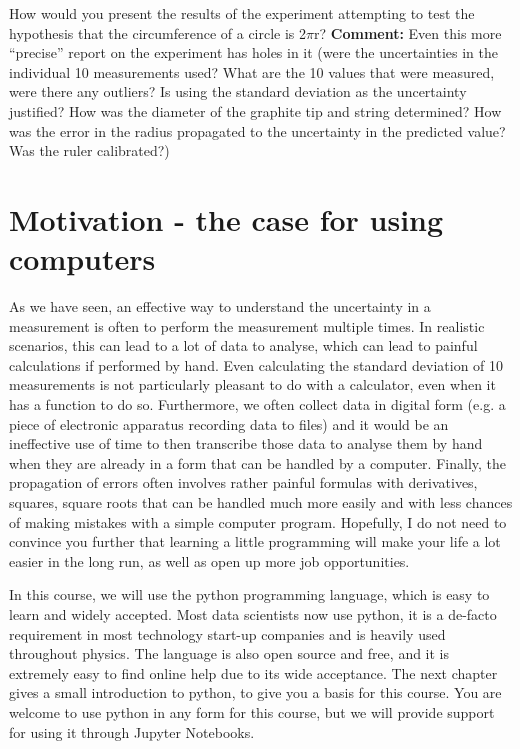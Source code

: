 \begin{example}{0pt}{How would you present the results of the experiment attempting to test the hypothesis that the circumference of a circle is 2$\pi$r?}{}
\textbf{Comment:} Even this more ``precise'' report on the experiment has holes in it (were the uncertainties in the individual 10 measurements used? What are the 10 values that were measured, were there any outliers? Is using the standard deviation as the uncertainty justified? How was the diameter of the graphite tip and string determined? How was the error in the radius propagated to the uncertainty in the predicted value? Was the ruler calibrated?)
\end{example}




\section{Motivation - the case for using computers}
As we have seen, an effective way to understand the uncertainty in a measurement is often to perform the measurement multiple times. In realistic scenarios, this can lead to a lot of data to analyse, which can lead to painful calculations if performed by hand. Even calculating the standard deviation of 10 measurements is not particularly pleasant to do with a calculator, even when it has a function to do so. Furthermore, we often collect data in digital form (e.g. a piece of electronic apparatus recording data to files) and it would be an ineffective use of time to then transcribe those data to analyse them by hand when they are already in a form that can be handled by a computer. Finally, the propagation of errors often involves rather painful formulas with derivatives, squares, square roots that can be handled much more easily and with less chances of making mistakes with a simple computer program. Hopefully, I do not need to convince you further that learning a little programming will make your life a lot easier in the long run, as well as open up more job opportunities.

In this course, we will use the python programming language, which is easy to learn and widely accepted. Most data scientists now use python, it is a de-facto requirement in most technology start-up companies and is heavily used throughout physics. The language is also open source and free, and it is extremely easy to find online help due to its wide acceptance. The next chapter gives a small introduction to python, to give you a basis for this course. You are welcome to use python in any form for this course, but we will provide support for using it through Jupyter Notebooks.


